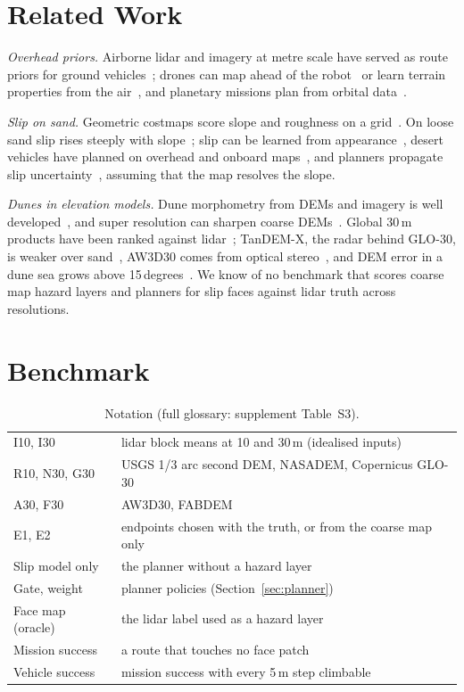 \documentclass[conference]{IEEEtran}
\begin{document}
\section{Related Work}
\textit{Overhead priors.} Airborne lidar and imagery at metre scale have served as route priors for ground vehicles~\cite{vandapel2006aerial}; drones can map ahead of the robot~\cite{delmerico2017active} or learn terrain properties from the air~\cite{fortin2025uav}, and planetary missions plan from orbital data~\cite{ono2016traversability}.

\textit{Slip on sand.} Geometric costmaps score slope and roughness on a grid~\cite{papadakis2013,goldberg2002}. On loose sand slip rises steeply with slope~\cite{ishigami2007,heverly2013,shrivastava2020}; slip can be learned from appearance~\cite{angelova2007slip}, desert vehicles have planned on overhead and onboard maps~\cite{thrun2006stanley}, and planners propagate slip uncertainty~\cite{inotsume2020robust}, assuming that the map resolves the slope.

\textit{Dunes in elevation models.} Dune morphometry from DEMs and imagery is well developed~\cite{hugenholtz2012remote,daynac2024workflow}, and super resolution can sharpen coarse DEMs~\cite{chen2016demsr}. Global 30\,m products have been ranked against lidar~\cite{guth2021ranking}; TanDEM-X, the radar behind GLO-30, is weaker over sand~\cite{martone2016enhancing}, AW3D30 comes from optical stereo~\cite{tadono2014aw3d}, and DEM error in a dune sea grows above 15\,degrees~\cite{wang2025multisource}. We know of no benchmark that scores coarse map hazard layers and planners for slip faces against lidar truth across resolutions.

\section{Benchmark}
\begin{table}[t]
\caption{Notation (full glossary: supplement Table~S3).}
\label{tab:notation}
\centering\scriptsize
\setlength{\tabcolsep}{3pt}
\begin{tabular}{@{}lp{}@{}}
\toprule
I10, I30 & lidar block means at 10 and 30\,m (idealised inputs) \\
R10, N30, G30 & USGS 1/3 arc second DEM, NASADEM, Copernicus GLO-30 \\
A30, F30 & AW3D30, FABDEM \\
E1, E2 & endpoints chosen with the truth, or from the coarse map only \\
Slip model only & the planner without a hazard layer \\
Gate, weight & planner policies (Section~\ref{sec:planner}) \\
Face map (oracle) & the lidar label used as a hazard layer \\
Mission success & a route that touches no face patch \\
Vehicle success & mission success with every 5\,m step climbable \\
\bottomrule
\end{tabular}
\end{table}
\end{document}
